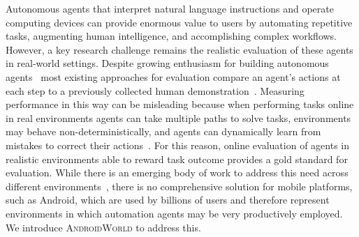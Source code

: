 \documentclass{article}
\newcommand{\system}{\textsc{AndroidWorld}\xspace}
\begin{document}
Autonomous agents that interpret natural language instructions and operate computing devices can provide enormous value to users by automating repetitive tasks, augmenting human intelligence, and accomplishing complex workflows.  However, a key research challenge remains the realistic evaluation of these agents in real-world settings. Despite growing enthusiasm for building autonomous agents~\citep{deng2023mind2web,rawles2023android,zheng2023seeact,koh2024visualwebarena,kim2024language,he2024webvoyager, AutoGPT, wu2023autogen, OpenAgents} most existing approaches for evaluation compare an agent's actions at each step to a previously collected human demonstration~\citep{deng2023mind2web, rawles2023android, yang2023appagent, zhang2023look, Lu2024-pg, zhang2024android, yan2023gpt4v,li2024-android-control}.  Measuring performance in this way can be misleading because when performing tasks online in real environments agents can take multiple paths to solve tasks, environments may behave non-deterministically, and agents can dynamically learn from mistakes to correct their actions~\citep{shinn2023reflexion, liu2018, Li2023-vo, Pan2024-kc}. For this reason, online evaluation of agents in realistic environments able to reward task outcome provides a gold standard for evaluation.  While there is an emerging body of work to address this need across different environments~\citep{zhou2023webarena, koh2024visualwebarena, drouin2024workarena, lee2024benchmarking,  xie2024osworld,bonatti2024windowsagentarenaevaluating, zheng2024agentstudiotoolkitbuildinggeneral}, there is no comprehensive solution for mobile platforms, such as Android, which are used by billions of users and therefore represent environments in which automation agents may be very productively employed. We introduce \system to address this.
\end{document}
